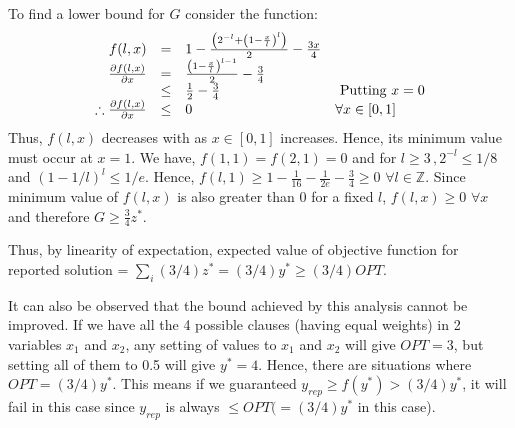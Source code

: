 To find a lower bound for $G$ consider the function:
\[
\begin{array}{rcll}
f(l,x) & = & 1 - \frac {\left( 2^{-l} + \left( 1 - \frac{x}{l} \right)^{l}\right)}{2} - \frac{3x}{4} & \\

\frac{\partial f(l,x)}{\partial x} & = & \frac{\left( 1 - \frac{x}{l} \right)^{l-1}}{2} - \frac{3}{4} &\\
		& \leq & \frac{1}{2} - \frac{3}{4} & $ Putting $x=0\\
\therefore \frac{\partial f(l,x)}{\partial x} & \leq & 0 & \forall x \in [0,1]
\end{array}
\]
Thus, $f(l,x)$ decreases with as $x \in [0,1]$ increases. Hence, its minimum value must occur at $x=1$. We have, $f(1,1) = f(2,1) = 0$ and for $l\geq 3\,, 2^{-l} \leq 1/8$ and $(1-1/l)^l \leq 1/e$. Hence, $f(l,1) \geq 1- \frac{1}{16} - \frac{1}{2e} - \frac{3}{4} \geq 0 \,\, \forall l \in \mathbb{Z}$. Since minimum value of $f(l,x)$ is also greater than 0 for a fixed $l$, $f(l,x) \geq 0 \,\, \forall x$ and therefore $G \geq \frac{3}{4}z^*$.

Thus, by linearity of expectation, expected value of objective function for reported solution = $\sum_i (3/4)z^* = (3/4)y^* \geq (3/4)OPT$.

It can also be observed that the bound achieved by this analysis cannot be improved. If we have all the 4 possible clauses (having equal weights) in 2 variables $x_1$ and $x_2$, any setting of values to $x_1$ and $x_2$ will give $OPT = 3$, but setting all of them to 0.5 will give $y^* = 4$. Hence, there are situations where $OPT = (3/4)y^*$. This means if we guaranteed $y_{rep} \geq f(y^*) > (3/4)y^*$, it will fail in this case since $y_{rep}$ is always $\leq OPT (= (3/4) y^*$ in this case).
